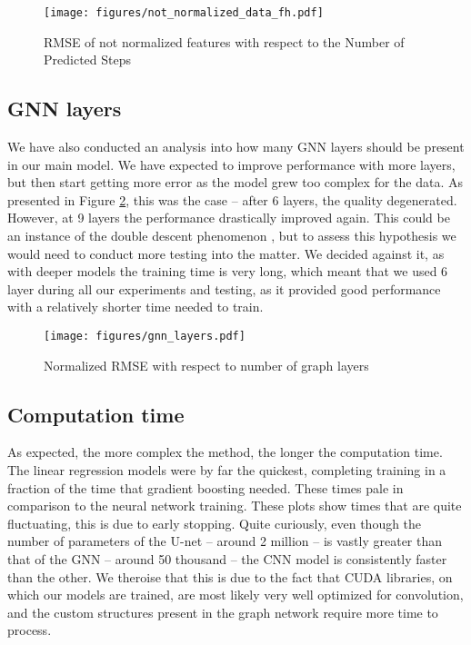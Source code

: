 \begin{figure}[!ht]
    \centering
    \texttt{[image: figures/not\_normalized\_data\_fh.pdf]}
    \caption{RMSE of not normalized features with respect to the Number of Predicted Steps}
    \label{fig:not-normalized-data-fh-plot}
\end{figure}

\FloatBarrier

\subsection{GNN layers}\label{chap:gnn-layers}
We have also conducted an analysis into how many GNN layers should be present in our main model. We have expected to improve performance with more layers, but then start getting more error as the model grew too complex for the data. As presented in Figure \ref{fig:gnn-layers}, this was the case -- after 6 layers, the quality degenerated. However, at 9 layers the performance drastically improved again. This could be an instance of the double descent phenomenon \cite{DBLP:journals/corr/abs-1912-02292}, but to assess this hypothesis we would need to conduct more testing into the matter. We decided against it, as with deeper models the training time is very long, which meant that we used 6 layer during all our experiments and testing, as it provided good performance with a relatively shorter time needed to train.

\begin{figure}[!ht]
    \centering
    \texttt{[image: figures/gnn\_layers.pdf]}
    \caption{Normalized RMSE with respect to number of graph layers}
    \label{fig:gnn-layers}
\end{figure}

\FloatBarrier

\subsection{Computation time}
As expected, the more complex the method, the longer the computation time. The linear regression models were by far the quickest, completing training in a fraction of the time that gradient boosting needed. These times pale in comparison to the neural network training. These plots show times that are quite fluctuating, this is due to early stopping. Quite curiously, even though the number of parameters of the U-net -- around 2 million -- is vastly greater than that of the GNN -- around 50 thousand -- the CNN model is consistently faster than the other. We theroise that this is due to the fact that CUDA libraries, on which our models are trained, are most likely very well optimized for convolution, and the custom structures present in the graph network require more time to process.

